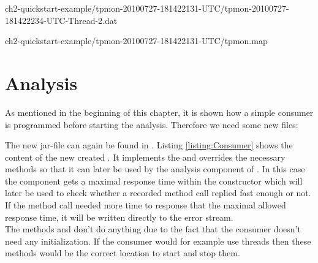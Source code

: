 
\setBashListing
%
{ch2-quickstart-example/tpmon-20100727-181422131-UTC/tpmon-20100727-181422234-UTC-Thread-2.dat}

%
{ch2-quickstart-example/tpmon-20100727-181422131-UTC/tpmon.map}


\section{Analysis}\label{sec:example:analysis}
As mentioned in the beginning of this chapter, it is shown how a simple consumer is programmed before starting the analysis. Therefore we need some new files:

\vspace{1ex}
\vspace{1ex}
		
The new jar-file can again be found in . Listing \ref{listing:Consumer} shows the content of the new created . It implements the  and overrides the necessary methods so that it can later be used by the analysis component of \Kieker. In this case the component gets a maximal response time within the constructor which will later be used to check whether a recorded method call replied fast enough or not. If the method call needed more time to response that the maximal allowed response time, it will be written directly to the error stream.\\
The methods  and  don't do anything due to the fact that the consumer doesn't need any initialization. If the consumer would for example use threads then these methods would be the correct location to start and stop them.

